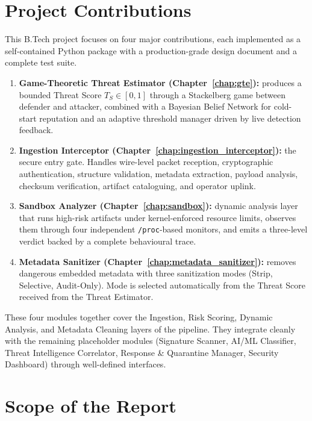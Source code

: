 \documentclass[12pt, a4paper]{report}
\begin{document}
\section{Project Contributions}

This B.Tech project focuses on four major contributions, each implemented
as a self-contained Python package with a production-grade design document
and a complete test suite.

\begin{enumerate}
    \item \textbf{Game-Theoretic Threat Estimator
          (Chapter~\ref{chap:gte}):} produces a bounded Threat Score
          $T_S \in [0,1]$ through a Stackelberg game between defender and
          attacker, combined with a Bayesian Belief Network for cold-start
          reputation and an adaptive threshold manager driven by live
          detection feedback.
    \item \textbf{Ingestion Interceptor (Chapter~\ref{chap:ingestion_interceptor}):}
          the secure entry gate. Handles wire-level packet reception,
          cryptographic authentication, structure validation, metadata
          extraction, payload analysis, checksum verification, artifact
          cataloguing, and operator uplink.
    \item \textbf{Sandbox Analyzer (Chapter~\ref{chap:sandbox}):} dynamic
          analysis layer that runs high-risk artifacts under kernel-enforced
          resource limits, observes them through four independent
          \texttt{/proc}-based monitors, and emits a three-level verdict
          backed by a complete behavioural trace.
    \item \textbf{Metadata Sanitizer (Chapter~\ref{chap:metadata_sanitizer}):}
          removes dangerous embedded metadata with three sanitization modes
          (Strip, Selective, Audit-Only). Mode is selected automatically
          from the Threat Score received from the Threat Estimator.
\end{enumerate}

These four modules together cover the Ingestion, Risk Scoring, Dynamic
Analysis, and Metadata Cleaning layers of the pipeline. They integrate
cleanly with the remaining placeholder modules (Signature Scanner, AI/ML
Classifier, Threat Intelligence Correlator, Response \& Quarantine Manager,
Security Dashboard) through well-defined interfaces.

\section{Scope of the Report}
\end{document}
